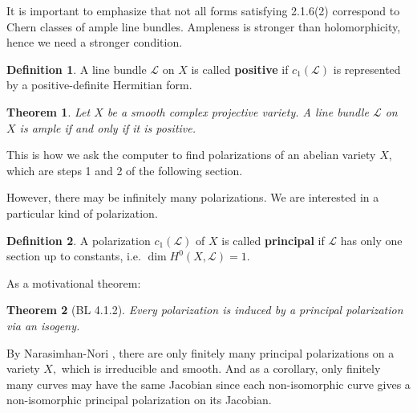 \documentclass[12pt,reqno]{amsart}
\newcommand{\C}{\mathbb{C}}
\newcommand{\R}{\mathbb{R}}
\newcommand{\mc}{\mathcal}
\newtheorem*{thm*}{Theorem}
\theoremstyle{definition}
\newtheorem{defn}{Definition}
\theoremstyle{remark}
\newtheorem*{remark}{Remark}
\begin{document}
It is important to emphasize that not all forms satisfying 2.1.6(2) correspond to Chern classes of ample line bundles. Ampleness is stronger than holomorphicity, hence we need a stronger condition. 

\begin{defn} 
A line bundle $\mc{L}$ on $X$ is called \textbf{positive} if $c_1(\mc{L})$ is represented by a positive-definite Hermitian form.
\end{defn}

\begin{thm*} 
Let $X$ be a smooth complex projective variety. A line bundle $\mc{L}$ on $X$ is ample if and only if it is positive.
\end{thm*}



This is how we ask the computer to find polarizations of an abelian variety $X$, which are steps 1 and 2 of the following section.

However, there may be infinitely many polarizations. We are interested in a particular kind of polarization.

\begin{defn}  A polarization $c_1(\mc{L})$ of $X$ is called \textbf{principal} if $\mc{L}$ has only one section up to constants, i.e. $\dim H^0(X, \mc{L}) = 1$.  \end{defn} 

As a motivational theorem:

\begin{thm*} [BL 4.1.2] Every polarization is induced by a principal polarization via an isogeny. \end{thm*}

By Narasimhan-Nori \cite{nn}, there are only finitely many principal polarizations on a variety $X,$ which is irreducible and smooth. And as a corollary, only finitely many curves may have the same Jacobian since each non-isomorphic curve gives a non-isomorphic principal polarization on its Jacobian.
\end{document}

